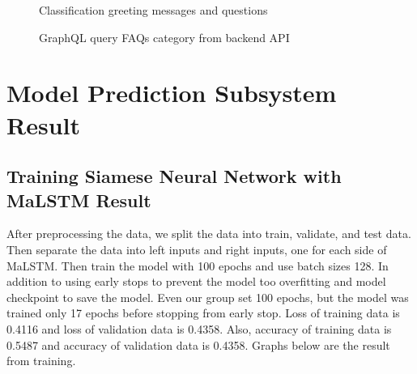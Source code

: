 \documentclass[12pt,oneside,openright,a4paper]{cpe-english-project}
\begin{document}
\begin{figure}[!h]\centering
{}
\caption{Classification greeting messages and questions}\label{fig:Classification greeting messages and questions}
\end{figure}
\begin{figure}[!h]\centering
{}
\caption{GraphQL query FAQs category from backend API}\label{fig:GraphQL query FAQs category from backend API}
\end{figure}

\section{Model Prediction Subsystem Result}
\subsection{Training Siamese Neural Network with MaLSTM Result}
After preprocessing the data, we split the data into train, validate, and test data. Then separate the data into left inputs and right inputs, one for each side of MaLSTM. Then train the model with 100 epochs and use batch sizes 128. In addition to using early stops to prevent the model too overfitting and model checkpoint to save the model. Even our group set 100 epochs, but the model was trained only 17 epochs before stopping from early stop. Loss of training data is 0.4116 and loss of validation data is 0.4358. Also, accuracy of training data is 0.5487 and accuracy of validation data is 0.4358. Graphs below are the result from training.
\end{document}
